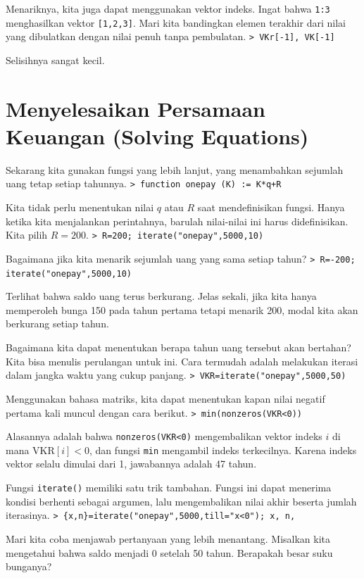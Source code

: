 \documentclass[11pt, a4paper]{article}
\newcommand{\emtcmd}[1]{\noindent\texttt{\textcolor{emtcommand}{>}\ #1}\par\smallskip}
\begin{document}
Menariknya, kita juga dapat menggunakan vektor indeks. Ingat bahwa \texttt{1:3} menghasilkan vektor \texttt{[1,2,3]}. Mari kita bandingkan elemen terakhir dari nilai yang dibulatkan dengan nilai penuh tanpa pembulatan.
\emtcmd{VKr[-1], VK[-1]}

Selisihnya sangat kecil.

\section*{Menyelesaikan Persamaan Keuangan (Solving Equations)}

Sekarang kita gunakan fungsi yang lebih lanjut, yang menambahkan sejumlah uang tetap setiap tahunnya.
\emtcmd{function onepay (K) := K*q+R}

Kita tidak perlu menentukan nilai $q$ atau $R$ saat mendefinisikan fungsi. Hanya ketika kita menjalankan perintahnya, barulah nilai-nilai ini harus didefinisikan. Kita pilih $R=200$.
\emtcmd{R=200; iterate("onepay",5000,10)}

Bagaimana jika kita menarik sejumlah uang yang sama setiap tahun?
\emtcmd{R=-200; iterate("onepay",5000,10)}

Terlihat bahwa saldo uang terus berkurang. Jelas sekali, jika kita hanya memperoleh bunga 150 pada tahun pertama tetapi menarik 200, modal kita akan berkurang setiap tahun.

Bagaimana kita dapat menentukan berapa tahun uang tersebut akan bertahan? Kita bisa menulis perulangan untuk ini. Cara termudah adalah melakukan iterasi dalam jangka waktu yang cukup panjang.
\emtcmd{VKR=iterate("onepay",5000,50)}

Menggunakan bahasa matriks, kita dapat menentukan kapan nilai negatif pertama kali muncul dengan cara berikut.
\emtcmd{min(nonzeros(VKR<0))}

Alasannya adalah bahwa \texttt{nonzeros(VKR<0)} mengembalikan vektor indeks $i$ di mana $\text{VKR}[i]<0$, dan fungsi \texttt{min} mengambil indeks terkecilnya. Karena indeks vektor selalu dimulai dari 1, jawabannya adalah 47 tahun.

Fungsi \texttt{iterate()} memiliki satu trik tambahan. Fungsi ini dapat menerima kondisi berhenti sebagai argumen, lalu mengembalikan nilai akhir beserta jumlah iterasinya.
\emtcmd{\{x,n\}=iterate("onepay",5000,till="x<0"); x, n,}

Mari kita coba menjawab pertanyaan yang lebih menantang. Misalkan kita mengetahui bahwa saldo menjadi 0 setelah 50 tahun. Berapakah besar suku bunganya?
\end{document}
